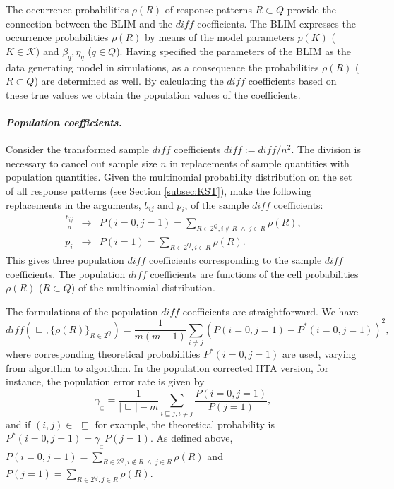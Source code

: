 \documentclass[nojss]{jss}
\begin{document}
The occurrence probabilities $\rho(R)$ of response patterns $R\subset Q$ provide the connection
between the BLIM and the $\mathit{diff}$ coefficients. The BLIM expresses the occurrence probabilities $\rho(R)$ by means of the model parameters $p(K)$ ($K\in \mathcal{K}$) and
$\beta_q, \eta_q$ ($q\in Q$). Having specified the parameters of the BLIM as the data generating
model in simulations, as a consequence the probabilities $\rho(R)$ ($R\subset Q$) are determined 
as well. By calculating the $\mathit{diff}$ coefficients based on these true values we obtain the
population values of the coefficients.

\paragraph{\it Population coefficients.}
Consider the transformed sample $\mathit{diff}$ coefficients $\mathit{diff} := \mathit{diff}/n^2$. 
The division is necessary to cancel out sample size $n$ in replacements of sample quantities with population quantities. Given the multinomial probability distribution on the set of all response
patterns (see Section \ref{subsec:KST}), make the following replacements in the arguments, 
$b_{ij}$ and $p_i$, of the sample $\mathit{diff}$ coefficients:
\begin{eqnarray*}
\frac{b_{ij}}{n} &\rightarrow & P(i = 0, j = 1) = \sum_{R \in 2^Q, i\not \in R \; \wedge \; j \in R} \rho(R), \\
p_i &\rightarrow & P(i=1) =\sum_{R \in 2^Q, i \in R} \rho(R).
\end{eqnarray*}
This gives three population $\mathit{diff}$ coefficients corresponding to the sample $\mathit{diff}$ coefficients. 
The population $\mathit{diff}$ coefficients are functions of the cell
probabilities $\rho(R)$ ($R\subset Q$) of the multinomial distribution.

The formulations of the population $\mathit{diff}$ coefficients are straightforward. We have 
\begin{displaymath}
\mathit{diff} (\sqsubseteq, \{\rho(R)\}_{R\in 2^Q}) = 
\frac{1}{m(m-1)}\sum_{i \not= j} (P(i = 0, j = 1) - P^*(i = 0, j = 1))^2,
\end{displaymath}
where corresponding theoretical probabilities $P^*(i = 0, j = 1)$ are used, 
varying from algorithm to algorithm. In the population corrected IITA version, for instance, 
the population error rate is given by 
\[
\gamma_{_\sqsubseteq}=\frac{1}{|\!\sqsubseteq\!| - m}\sum\limits_{i \sqsubseteq j, i \not= j} \frac{P(i = 0, j = 1)}{P(j=1)},
\]
and if $(i,j)\in \,\,\sqsubseteq$ for example, the theoretical probability is 
$P^*(i=0,j=1) = \gamma_{_\sqsubseteq} P(j=1)$.
As defined above, $P(i = 0, j = 1) = \sum_{R \in 2^Q, i\not \in R \; \wedge \; j \in R} \rho(R)$
and $P(j=1) =\sum_{R \in 2^Q, j \in R} \rho(R)$.
\end{document}
